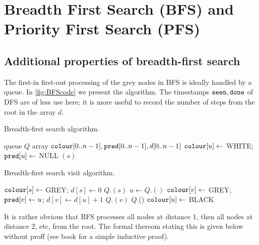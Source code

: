 \chapter{Breadth First Search (BFS) and Priority First Search (PFS)}

\section{Additional properties of breadth-first search}
\label{sec:bfs}

The first-in first-out processing of the grey nodes in BFS is ideally
handled by a queue. In \cref{fig:BFScode} we present the algorithm.
The timestamps $\seen, \done$ of DFS are of less use here;
it is more useful to record the number of steps from the root in the
array $d$.


\begin{algorithm}[H]
  \caption{Breadth-first search algorithm.}
    \label{alg:BFScode}
\begin{algorithmic}[1]
	\State queue $Q$  
	\State array $\colour[0..n-1], \pred[0..n-1], d[0..n-1]$
		\State $\colour[u] \gets $ WHITE; $\pred[u] \gets $ NULL
	\EndFor
			\State {}$(s)$
		\EndIf
	\EndFor
	\State {}
\EndFunction
\end{algorithmic}
\end{algorithm}
\begin{algorithm}[H]
  \caption{Breadth-first search visit algorithm.}
  \begin{algorithmic}[1]
	\State $\colour[s] \gets $ GREY; $d[s] \gets 0$ 
	\State $Q$.$(s)$
		\State $u \gets Q$.$()$
				\State $\colour[v] \gets $ GREY; $\pred[v] \gets u$; $d[v] \gets d[u]+1$
				\State $Q$.$(v)$
			\EndIf
		\EndFor
		\State $Q$.()
		\State $\colour[u] \gets $ BLACK
	\EndWhile
\EndFunction
\end{algorithmic}
\end{algorithm}


It is rather obvious that BFS processes all nodes at distance 1, then
all nodes at distance 2, etc, from the root. The formal thereom stating this is given below without proff (see book for a simple inductive proof).

